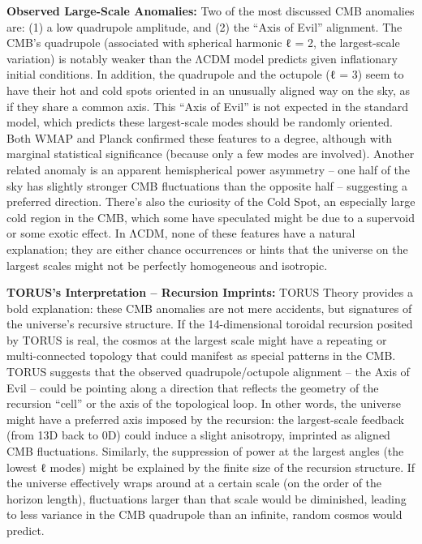 \documentclass[]{article}
\begin{document}
\textbf{Observed Large-Scale Anomalies:} Two of the most discussed CMB
anomalies are: (1) a low quadrupole amplitude, and (2) the ``Axis of
Evil'' alignment. The CMB's quadrupole (associated with spherical
harmonic ℓ = 2, the largest-scale variation) is notably weaker than the
ΛCDM model predicts given inflationary initial conditions. In addition,
the quadrupole and the octupole (ℓ = 3) seem to have their hot and cold
spots oriented in an unusually aligned way on the sky, as if they share
a common axis. This ``Axis of Evil'' is not expected in the standard
model, which predicts these largest-scale modes should be randomly
oriented. Both WMAP and Planck confirmed these features to a degree,
although with marginal statistical significance (because only a few
modes are involved). Another related anomaly is an apparent
hemispherical power asymmetry -- one half of the sky has slightly
stronger CMB fluctuations than the opposite half -- suggesting a
preferred direction. There's also the curiosity of the Cold Spot, an
especially large cold region in the CMB, which some have speculated
might be due to a supervoid or some exotic effect. In ΛCDM, none of
these features have a natural explanation; they are either chance
occurrences or hints that the universe on the largest scales might not
be perfectly homogeneous and isotropic.

\textbf{TORUS's Interpretation -- Recursion Imprints:} TORUS Theory
provides a bold explanation: these CMB anomalies are not mere accidents,
but signatures of the universe's recursive structure. If the
14-dimensional toroidal recursion posited by TORUS is real, the cosmos
at the largest scale might have a repeating or multi-connected topology
that could manifest as special patterns in the CMB. TORUS suggests that
the observed quadrupole/octupole alignment -- the Axis of Evil -- could
be pointing along a direction that reflects the geometry of the
recursion ``cell'' or the axis of the topological loop. In other words,
the universe might have a preferred axis imposed by the recursion: the
largest-scale feedback (from 13D back to 0D) could induce a slight
anisotropy, imprinted as aligned CMB fluctuations. Similarly, the
suppression of power at the largest angles (the lowest ℓ modes) might be
explained by the finite size of the recursion structure. If the universe
effectively wraps around at a certain scale (on the order of the horizon
length), fluctuations larger than that scale would be diminished,
leading to less variance in the CMB quadrupole than an infinite, random
cosmos would predict.
\end{document}
